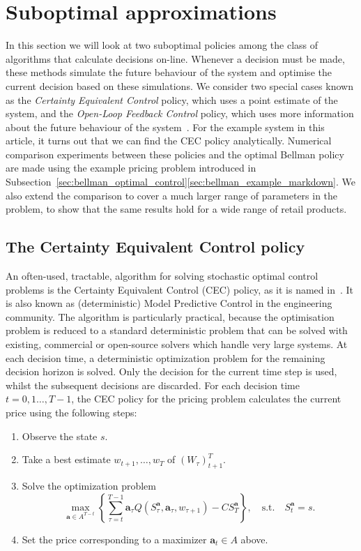 \documentclass[main.tex]{subfiles}
\begin{document}
\listoftodos

\section{Suboptimal
  approximations}\label{sec:suboptimal_approximations}
In this section we will look at two suboptimal policies among the class of
algorithms that calculate decisions on-line.
Whenever a decision must be made, these methods simulate the future
behaviour of the system and optimise the current decision based on
these simulations.
We consider two special cases known as the
\emph{Certainty Equivalent Control} policy, which uses a point
estimate of the system, and
the \emph{Open-Loop Feedback Control} policy, which uses more
information about the  future behaviour of the system~\cite[Ch.~6]{bertsekas2005dynamic}.
For the example system in this article, it turns out that we can find
the CEC policy analytically.
Numerical comparison experiments between these policies and the optimal
Bellman policy are
made using the example pricing problem introduced in
Subsection~\ref{sec:bellman_optimal_control}\ref{sec:bellman_example_markdown}. We also extend the comparison to
cover a much larger range of parameters in the problem, to show that
the same results hold for a wide range of retail products.

\subsection{The Certainty Equivalent Control policy}
An often-used, tractable, algorithm for solving stochastic optimal control
problems is the Certainty Equivalent Control (CEC) policy, as it is
named in~\cite{bertsekas2005dynamic}.
It is also known as (deterministic) Model
Predictive Control in the engineering community.
The algorithm is particularly practical, because the optimisation
problem is reduced to a standard deterministic problem that can
be solved with existing, commercial or open-source solvers which
handle very large systems.
At each decision time, a deterministic optimization problem for the
remaining decision horizon is solved. Only the decision for the
current time step is
used, whilst the subsequent decisions are discarded.
For each decision time $t=0,1\dots,T-1$, the CEC policy for the pricing
problem calculates the current price using the following steps:
\begin{enumerate}
\item Observe the state $s$.
\item Take a best estimate $w_{t+1},\dots,w_T$ of ${(W_\tau)}_{t+1}^T$.
\item Solve the optimization problem
  \begin{equation}\label{eq:cec_optim_problem}
    \max_{\mathbf a\in A^{T-t}}\left\{\sum_{\tau=t}^{T-1}\mathbf
      a_\tau Q(S_\tau^{\mathbf a},\mathbf
      a_\tau,w_{\tau+1})-CS_T^{\mathbf a}\right\},
    \quad \text{s.t.}\quad S_t^{\mathbf a}=s.
  \end{equation}
\item Set the price corresponding to a maximizer
  $\mathbf a_t\in A$ above.
\end{enumerate}
\end{document}

